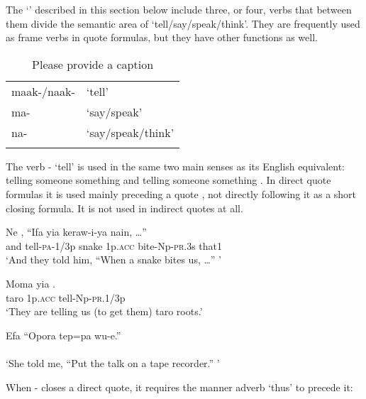 The `' described in this section below include three, or four, verbs that between them divide the semantic area of `tell/say/speak/think'. They are frequently used as frame verbs in quote formulas, but they have other functions as well.

\begin{table}
\caption{Please provide a caption}
\label{} 
\begin{tabular}{ll}
\mytoprule
maak-/naak- &`tell'\\
ma- &`say/speak'\\
na- &`say/speak/think'\\
\mybottomrule
\end{tabular}

\end{table}

The verb - `tell' is used in the same two main senses as its English equivalent: telling someone  something  and telling someone  something . In direct quote formulas it is used mainly preceding a quote , not directly following it as a short closing formula. It is not used in indirect quotes at all.

\ea%
\label{ex:3:x312}
\gll Ne , ``Ifa yia keraw-i-ya nain, {\dots''} \\
and tell-\textsc{pa}-1/3p snake 1p.\textsc{acc} bite-Np-\textsc{pr}.3s that1\\
\glt`And they told him, ``When a snake bites us, {\dots}'' '
\z

\ea%
\label{ex:3:x313}
\gll Moma yia . \\
taro 1p.\textsc{acc} tell-Np-\textsc{pr}.1/3p \\
\glt`They are telling us (to get them) taro roots.'
\z

\ea%
\label{ex:3:x314}
\gll Efa\textstyleFreeTranslationChar{ } \textstyleFreeTranslationChar{, } ``Opora tep=pa wu-e.'' \\
\\
\glt`She told me, ``Put the talk on a tape recorder.'' '
\z

When - closes a direct quote, it requires the manner adverb  `thus' to precede it:


